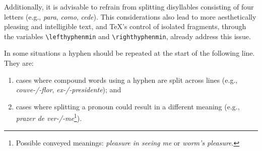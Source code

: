 Additionally, it is advisable to refrain from
splitting disyllables consisting of four letters (e.g., \emph{para},
\emph{como}, \emph{cede}). This considerations also lead to more aesthetically
pleasing and intelligible text, and \TeX{}'s control of isolated fragments,
through the variables \verb|\lefthyphenmin| and \verb|\righthyphenmin|, already
address this issue.


In some situations a hyphen should be repeated at the start of the following
line. They are: 
\begin{enumerate}
\item cases where compound words using a hyphen are split across lines (e.g.,
    \emph{couve-/-flor}, \emph{ex-/-presidente}); and
\item cases where splitting a pronoun could result in a different meaning (e.g.,
    \emph{prazer de ver-/-me}\footnote{Possible conveyed meanings: 
    \emph{pleasure in seeing me} or \emph{worm's pleasure}.}). 
\end{enumerate}


